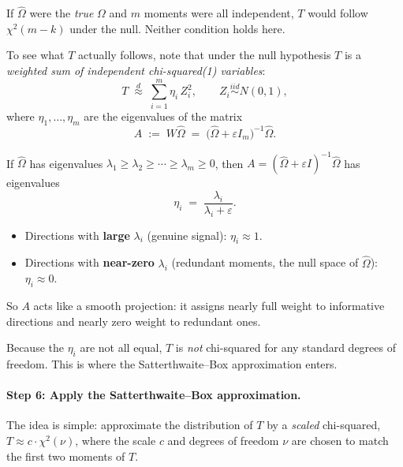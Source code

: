 If $\hat\Omega$ were the \emph{true} $\Omega$ and $m$ moments were all
independent, $T$ would follow $\chi^2(m-k)$ under the null.  Neither
condition holds here.

To see what $T$ actually follows, note that under the null hypothesis
$T$ is a \emph{weighted sum of independent chi-squared(1) variables}:
\begin{equation}
  T \;\overset{d}{\approx}\;
    \sum_{i=1}^{m} \eta_i\, Z_i^2,
    \qquad Z_i \overset{iid}{\sim} N(0,1),
  \label{eq:weighted_chisq}
\end{equation}
where $\eta_1,\ldots,\eta_m$ are the eigenvalues of the matrix
\begin{equation}
  A \;:=\; W\hat\Omega
          \;=\; \bigl(\hat\Omega + \varepsilon I_m\bigr)^{-1}\hat\Omega.
  \label{eq:A_matrix}
\end{equation}

\medskip
\begin{tcolorbox}[colback=gray!8, colframe=gray!40,
  title=What are these eigenvalues $\eta_i$?]
If $\hat\Omega$ has eigenvalues $\lambda_1 \geq \lambda_2 \geq \cdots \geq \lambda_m \geq 0$,
then $A = (\hat\Omega + \varepsilon I)^{-1}\hat\Omega$ has eigenvalues
\[
  \eta_i \;=\; \frac{\lambda_i}{\lambda_i + \varepsilon}.
\]
\begin{itemize}[noitemsep]
  \item Directions with \textbf{large} $\lambda_i$ (genuine signal):
        $\eta_i \approx 1$.
  \item Directions with \textbf{near-zero} $\lambda_i$ (redundant
        moments, the null space of $\hat\Omega$): $\eta_i \approx 0$.
\end{itemize}
So $A$ acts like a smooth projection: it assigns nearly full weight
to informative directions and nearly zero weight to redundant ones.
\end{tcolorbox}

\medskip
\noindent Because the $\eta_i$ are not all equal, $T$ is \emph{not}
chi-squared for any standard degrees of freedom.  This is where the
Satterthwaite--Box approximation enters.

\paragraph{Step 6: Apply the Satterthwaite--Box approximation.}

The idea is simple: approximate the distribution of $T$ by a
\emph{scaled} chi-squared, $T \approx c\cdot\chi^2(\nu)$, where the
scale $c$ and degrees of freedom $\nu$ are chosen to match the first
two moments of $T$.

